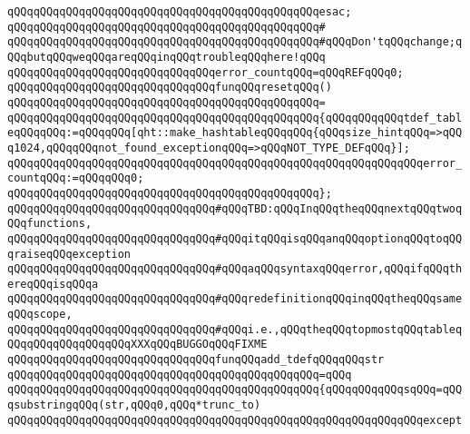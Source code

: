 \verb|qQQqqQQqqQQqqQQqqQQqqQQqqQQqqQQqqQQqqQQqqQQqqQQqesac;|\newline
\verb|qQQqqQQqqQQqqQQqqQQqqQQqqQQqqQQqqQQqqQQqqQQqqQQq#|\newline
\verb|qQQqqQQqqQQqqQQqqQQqqQQqqQQqqQQqqQQqqQQqqQQqqQQq#qQQqDon'tqQQqchange;qQQqbutqQQqweqQQqareqQQqinqQQqtroubleqQQqhere!qQQq|\newline
\newline
\verb|qQQqqQQqqQQqqQQqqQQqqQQqqQQqqQQqerror_countqQQq=qQQqREFqQQq0;|\newline
\newline
\verb|qQQqqQQqqQQqqQQqqQQqqQQqqQQqqQQqfunqQQqresetqQQq()|\newline
\verb|qQQqqQQqqQQqqQQqqQQqqQQqqQQqqQQqqQQqqQQqqQQqqQQq=|\newline
\verb|qQQqqQQqqQQqqQQqqQQqqQQqqQQqqQQqqQQqqQQqqQQqqQQq{qQQqqQQqqQQqtdef_tableqQQqqQQq:=qQQqqQQq[qht::make_hashtableqQQqqQQq{qQQqsize_hintqQQq=>qQQq1024,qQQqqQQqnot_found_exceptionqQQq=>qQQqNOT_TYPE_DEFqQQq}];|\newline
\newline
\verb|qQQqqQQqqQQqqQQqqQQqqQQqqQQqqQQqqQQqqQQqqQQqqQQqqQQqqQQqqQQqqQQqerror_countqQQq:=qQQqqQQq0;|\newline
\verb|qQQqqQQqqQQqqQQqqQQqqQQqqQQqqQQqqQQqqQQqqQQqqQQq};|\newline
\newline
\verb|qQQqqQQqqQQqqQQqqQQqqQQqqQQqqQQq#qQQqTBD:qQQqInqQQqtheqQQqnextqQQqtwoqQQqfunctions,|\newline
\verb|qQQqqQQqqQQqqQQqqQQqqQQqqQQqqQQq#qQQqitqQQqisqQQqanqQQqoptionqQQqtoqQQqraiseqQQqexception|\newline
\verb|qQQqqQQqqQQqqQQqqQQqqQQqqQQqqQQq#qQQqaqQQqsyntaxqQQqerror,qQQqifqQQqthereqQQqisqQQqa|\newline
\verb|qQQqqQQqqQQqqQQqqQQqqQQqqQQqqQQq#qQQqredefinitionqQQqinqQQqtheqQQqsameqQQqscope,|\newline
\verb|qQQqqQQqqQQqqQQqqQQqqQQqqQQqqQQq#qQQqi.e.,qQQqtheqQQqtopmostqQQqtableqQQqqQQqqQQqqQQqqQQqXXXqQQqBUGGOqQQqFIXME|\newline
\newline
\verb|qQQqqQQqqQQqqQQqqQQqqQQqqQQqqQQqfunqQQqadd_tdefqQQqqQQqstr|\newline
\verb|qQQqqQQqqQQqqQQqqQQqqQQqqQQqqQQqqQQqqQQqqQQqqQQq=qQQq|\newline
\verb|qQQqqQQqqQQqqQQqqQQqqQQqqQQqqQQqqQQqqQQqqQQqqQQq{qQQqqQQqqQQqsqQQq=qQQqsubstringqQQq(str,qQQq0,qQQq*trunc_to)|\newline
\verb|qQQqqQQqqQQqqQQqqQQqqQQqqQQqqQQqqQQqqQQqqQQqqQQqqQQqqQQqqQQqqQQqexcept|\newline
